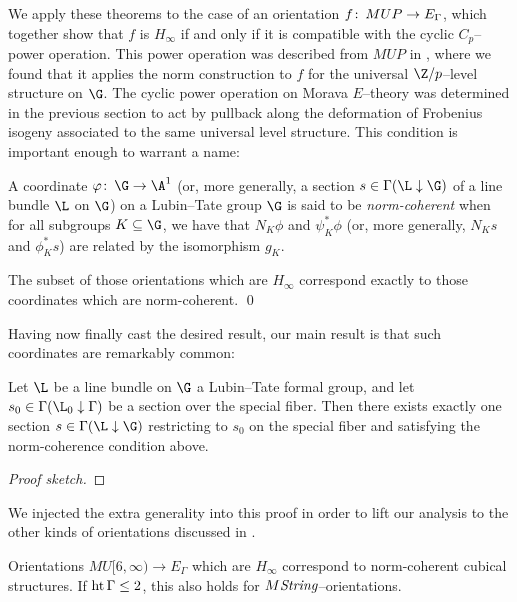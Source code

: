 We apply these theorems to the case of an orientation $f\colon\thinspace MUP \to E_\Gamma$, which together show that $f$ is $H_\infty$ if and only if it is compatible with the cyclic $C_p$--power operation.  This power operation was described from $MUP$ in , where we found that it applies the norm construction to $f$ for the universal $\Z/p$--level structure on $\G$.  The cyclic power operation on Morava $E$--theory was determined in the previous section to act by pullback along the deformation of Frobenius isogeny associated to the same universal level structure.  This condition is important enough to warrant a name:

\begin{definition}
A coordinate $\phi\co \G \to \A^1$ (or, more generally, a section $s \in \Gamma(\L \downarrow \G)$ of a line bundle $\L$ on $\G$) on a Lubin--Tate group $\G$ is said to be \textit{norm-coherent} when for all subgroups $K \subseteq \G$, we have that $N_K \phi$ and $\psi_K^* \phi$ (or, more generally, $N_K s$ and $\phi_K^* s$) are related by the isomorphism $g_K$.
\end{definition}

\begin{corollary}
The subset of those orientations which are $H_\infty$ correspond exactly to those coordinates which are norm-coherent. \qed
\end{corollary}

Having now finally cast the desired result, our main result is that such coordinates are remarkably common:

\begin{theorem}
Let $\L$ be a line bundle on $\G$ a Lubin--Tate formal group, and let $s_0 \in \Gamma(\L_0 \downarrow \Gamma)$ be a section over the special fiber.  Then there exists exactly one section $s \in \Gamma(\L \downarrow \G)$ restricting to $s_0$ on the special fiber and satisfying the norm-coherence condition above.
\end{theorem}
\begin{proof}[Proof sketch]

\end{proof}

We injected the extra generality into this proof in order to lift our analysis to the other kinds of orientations discussed in .

\begin{theorem}
Orientations $MU[6, \infty) \to E_\Gamma$ which are $H_\infty$ correspond to norm-coherent cubical structures.  If $\operatorname{ht}{\Gamma} \le 2$, this also holds for $M\mathit{String}$--orientations.
\end{theorem}


